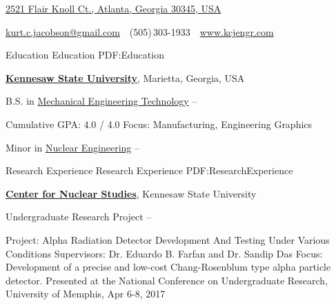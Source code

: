 \documentclass[letterpaper,MMMyyyy,nonstopmode]{simpleresumecv}
\newcommand{\CVAuthor}{Kurt C. Jacobson}
\newcommand{\CVWebpage}{www.kcjengr.com}
\begin{document}

\Title{\CVAuthor}

\begin{SubTitle}
\href{https://www.google.com/maps/place/2521+Flair+Knoll+Ct+NE,+Atlanta,+GA+30345}
{2521 Flair Knoll Ct., Atlanta, Georgia 30345, USA}
\par
\href{mailto:kurtcjacobson@gmail.com}
{kurt.c.jacobson@gmail.com}
\,\SubBulletSymbol\,
(505)\,303-1933
\,\SubBulletSymbol\,
\href{\CVWebpage}
{\url{\CVWebpage}}
\end{SubTitle}

\begin{Body}


\Section
{Education}
{Education}
{PDF:Education}

\Entry
\href{http://www.kennesaw.edu/}
{\textbf{Kennesaw State University}},
Marietta, Georgia, USA

\Gap
\BulletItem
B.S. in
\href{http://engineering.kennesaw.edu/engineering-technology/}
{Mechanical Engineering Technology}
\hfill
{} --
\begin{Detail}
\SubBulletItem
Cumulative GPA: 4.0 / 4.0
\SubBulletItem
Focus:
Manufacturing, Engineering Graphics
\end{Detail}

\Gap
\BulletItem
Minor in
\href{http://engineering.kennesaw.edu/nuclear-studies/}
{Nuclear Engineering}
\hfill
{} --


\Section
{Research Experience}
{Research Experience}
{PDF:ResearchExperience}

\Entry
\href{http://engineering.kennesaw.edu/nuclear-studies/}
{\textbf{Center for Nuclear Studies}},
Kennesaw State University

\Gap
\BulletItem
Undergraduate Research Project
\hfill
{} --
\begin{Detail}
\SubBulletItem
Project:
Alpha Radiation Detector Development And Testing Under Various Conditions
\SubBulletItem
Supervisors:
Dr. Eduardo B. Farfan and
Dr. Sandip Das
\SubBulletItem
Focus:
Development of a precise and low-cost Chang-Rosenblum type alpha particle detector.
\SubBulletItem
Presented at the National Conference on Undergraduate Research, University of Memphis, Apr 6-8, 2017
\end{Detail}



\end{Body}
\end{document}
